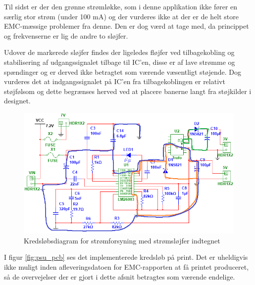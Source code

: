 Til sidst er der den grønne strømløkke, som i denne applikation ikke fører en særlig stor strøm (under 100 mA) og der vurderes ikke at der er de helt store EMC-mæssige problemer fra denne. 
Den er dog værd at tage med, da princippet og frekvenserne er lig de andre to sløjfer.

Udover de markerede sløjfer findes der ligeledes fløjfer ved tilbagekobling og stabilisering af udgangssignalet tilbage til IC'en, disse er af lave strømme og spændinger og er derved ikke betragtet som værende væsentligt støjende. Dog vurderes det at indgangssignalet på IC'en fra tilbagekoblingen er relativt støjfølsom og dette begrænses herved ved at placere banerne langt fra støjkilder i designet.

\clearpage

\begin{landscape}
\begin{figure}
\centering
\includegraphics[height=\textwidth -3.2 cm]{../fig/diagrammer/bil/psu_kredsloeb_EMC}
\caption{Kredsløbsdiagram for strømforsyning med strømsløjfer indtegnet}
\label{fig:psu_kredsloeb_EMC}
\end{figure}
\end{landscape}

\clearpage

I figur \ref{fig:psu_pcb} ses det implementerede kredsløb på print.
Det er uheldigvis ikke muligt inden afleveringsdatoen for EMC-rapporten at få printet produceret, så de overvejelser der er gjort i dette afsnit betragtes som værende endelige.

